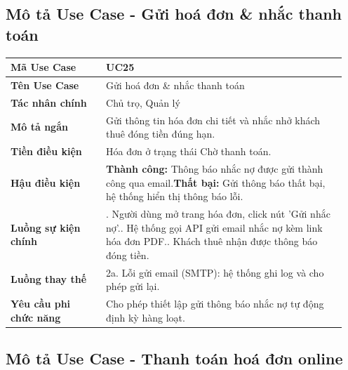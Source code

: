 \documentclass[a4paper,oneside]{report}
\begin{document}
\subsection{Mô tả Use Case - Gửi hoá đơn \& nhắc thanh toán}

\begin{longtable}[]{@{}>{\RaggedRight\arraybackslash}p{0.27\linewidth}>{\RaggedRight\arraybackslash}p{0.68\linewidth}@{}}
\toprule
\textbf{Mã Use Case} & UC25\tabularnewline
\midrule
\endhead
\textbf{Tên Use Case} & Gửi hoá đơn \& nhắc thanh toán\tabularnewline
\textbf{Tác nhân chính} & Chủ trọ, Quản lý\tabularnewline
\textbf{Mô tả ngắn} & Gửi thông tin hóa đơn chi tiết và nhắc nhở khách
thuê đóng tiền đúng hạn.\tabularnewline
\textbf{Tiền điều kiện} & Hóa đơn ở trạng thái Chờ thanh
toán.\tabularnewline
\textbf{Hậu điều kiện} & \textbf{Thành công:} Thông báo nhắc nợ được gửi thành công qua email.\newline \textbf{Thất bại:} Gửi thông báo thất bại, hệ thống hiển thị thông báo lỗi.\tabularnewline
\textbf{Luồng sự kiện chính} & 1. Người dùng mở trang
hóa đơn, click nút 'Gửi nhắc nợ'.\newline 2. Hệ thống gọi API gửi
email nhắc nợ kèm link hóa đơn PDF.\newline 3. Khách thuê nhận được
thông báo đóng tiền.\tabularnewline
\textbf{Luồng thay thế} & 2a. Lỗi gửi email (SMTP): hệ thống ghi log và
cho phép gửi lại.\tabularnewline
\textbf{Yêu cầu phi chức năng} & Cho phép thiết lập gửi thông báo nhắc
nợ tự động định kỳ hàng loạt.\tabularnewline
\bottomrule
\end{longtable}

\subsection{Mô tả Use Case - Thanh toán hoá đơn online}
\end{document}

